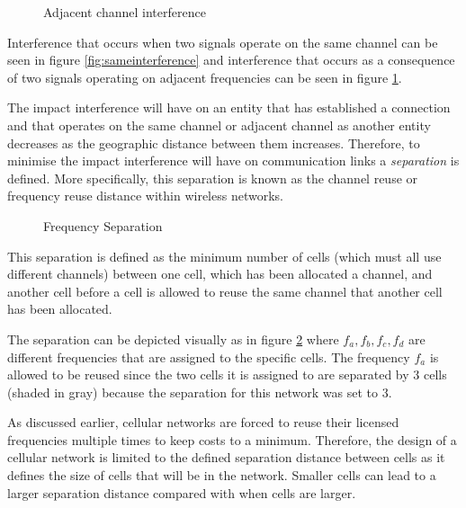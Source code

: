 \begin{figure}[bp!]
	\begin{centering}
	
	\label{fig:adjacentinterference}
	\caption{Adjacent channel interference}
	\end{centering}
\end{figure}
Interference that occurs when two signals operate on the same channel can be seen in figure \ref{fig:sameinterference} and interference that occurs as a consequence of two signals operating on adjacent frequencies can be seen in figure \ref{fig:adjacentinterference}.

The impact interference will have on an entity that has established a connection and that operates on the same channel or adjacent channel as another entity decreases as the geographic distance between them increases\cite{InterferenceOrientatedFAP}. Therefore, to minimise the impact interference will have on communication links a \emph{separation} is defined\cite{WirelessCommunications}. More specifically, this separation is known as the channel reuse or frequency reuse distance within wireless networks\cite{WirelessCommunications}.

\begin{figure}[t!]
	\begin{centering}
	
	\caption{Frequency Separation}
	\label{fig:seperationgraph}
	\end{centering}
\end{figure}

This separation is defined as the minimum number of cells (which must all use different channels) between one cell, which has been allocated a channel, and another cell before a cell is allowed to reuse the same channel that another cell has been allocated\cite{WirelessCommunications,InterferenceOrientatedFAP}. 

The separation can be depicted visually as in figure \ref{fig:seperationgraph} where $f_a,f_b,f_c,f_d$ are different frequencies that are assigned to the specific cells. The frequency $f_a$ is allowed to be reused since the two cells it is assigned to are separated by 3 cells (shaded in gray) because the separation for this network was set to 3.

As discussed earlier, cellular networks are forced to reuse their licensed frequencies multiple times to keep costs to a minimum. Therefore, the design of a cellular network is limited to the defined separation distance between cells as it defines the size of cells that will be in the network\cite{Eisenblatter,InterferenceOrientatedFAP}. Smaller cells can lead to a larger separation distance compared with when cells are larger\cite{WirelessCommunications,WirelessDigitalCommunications}.

